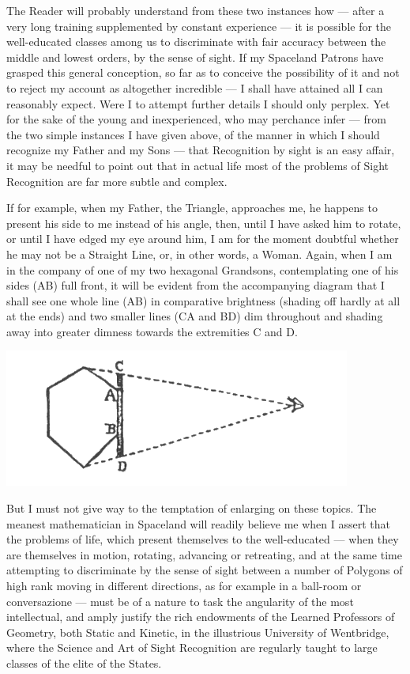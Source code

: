 \documentclass[12pt, a4paper, oneside]{memoir}
\begin{document}
The Reader will probably understand from these
two instances how --- after a very long training supplemented by constant
experience --- it is possible for the well-educated classes among us to
discriminate with fair accuracy between the middle and lowest orders, by the
sense of sight. If my Spaceland Patrons have grasped this general conception,
so far as to conceive the possibility of it and not to reject my account as
altogether incredible --- I shall have attained all I can reasonably expect.
Were I to attempt further details I should only perplex. Yet for the sake of
the young and inexperienced, who may perchance infer --- from the two simple
instances I have given above, of the manner in which I should recognize my
Father and my Sons --- that Recognition by sight is an easy affair, it may be
needful to point out that in actual life most of the problems of Sight
Recognition are far more subtle and complex.

If for example, when my Father, the Triangle, approaches me, he happens to
present his side to me instead of his angle, then, until I have asked him to
rotate, or until I have edged my eye around him, I am for the moment doubtful
whether he may not be a Straight Line, or, in other words, a Woman. Again,
when I am in the company of one of my two hexagonal Grandsons, contemplating
one of his sides (AB) full front, it will be evident from the accompanying
diagram that I shall see one whole line (AB) in comparative brightness
(shading off hardly at all at the ends) and two smaller lines (CA and BD) dim
throughout and shading away into greater dimness towards the extremities C and
D. 
\begin{center}
\includegraphics[trim=20mm 0mm 0mm 0mm, scale=0.5]{fig4}
\end{center}


But I must not give way to the temptation of enlarging on these
topics. The meanest mathematician in Spaceland will readily believe me when I
assert that the problems of life, which present themselves to the
well-educated --- when they are themselves in motion, rotating, advancing or
retreating, and at the same time attempting to discriminate by the sense of
sight between a number of Polygons of high rank moving in different
directions, as for example in a ball-room or conversazione --- must be of a
nature to task the angularity of the most intellectual, and amply justify the
rich endowments of the Learned Professors of Geometry, both Static and
Kinetic, in the illustrious University of Wentbridge, where the Science and
Art of Sight Recognition are regularly taught to large classes of the elite of
the States.
\end{document}
